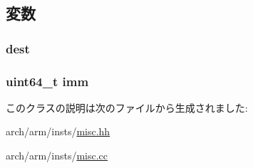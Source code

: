 \subsection{変数}
\hypertarget{classRegImmOp_aec72e8e45bdc87abeeeb75d2a8a9a716}{
\subsubsection[{dest}]{ {\bf dest}}}
\label{classRegImmOp_aec72e8e45bdc87abeeeb75d2a8a9a716}
\hypertarget{classRegImmOp_a2b4406ad2843b5aa12d244d01d8fdc69}{
\subsubsection[{imm}]{\setlength{\rightskip}{0pt plus 5cm}uint64\_\-t {\bf imm}}}
\label{classRegImmOp_a2b4406ad2843b5aa12d244d01d8fdc69}


このクラスの説明は次のファイルから生成されました:\begin{DoxyCompactItemize}
\item 
arch/arm/insts/\hyperlink{arch_2arm_2insts_2misc_8hh}{misc.hh}\item 
arch/arm/insts/\hyperlink{arch_2arm_2insts_2misc_8cc}{misc.cc}\end{DoxyCompactItemize}
